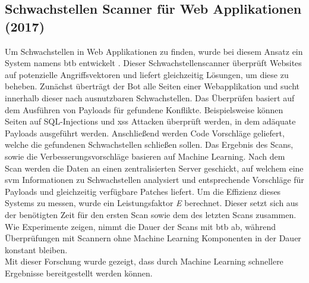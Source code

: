 \documentclass[
    12pt, %
    DIV10,
    ngerman, %
    a4paper, %
    oneside, %
    titlepage, %
    parskip=half, %
    headings=normal, %
    listof=totoc, %
    bibliography=totoc, %
    index=totoc, %
    captions=tableheading, %
    final %
]{scrreprt}
\begin{document}
\subsection{Schwachstellen Scanner für Web Applikationen (2017)}
Um Schwachstellen in Web Applikationen zu finden, wurde bei diesem Ansatz ein System namens \ac{btb} entwickelt \parencite{VidyavardhakaCollegeofEngineering2017}. Dieser Schwachstellenscanner überprüft Websites auf potenzielle Angriffsvektoren und liefert gleichzeitig Lösungen, um diese zu beheben. Zunächst überträgt der Bot alle Seiten einer Webapplikation und sucht innerhalb dieser nach ausnutzbaren Schwachstellen. Das Überprüfen basiert auf dem Ausführen von Payloads für gefundene Konflikte. Beispielsweise können Seiten auf SQL-Injections und \ac{xss} Attacken überprüft werden, in dem adäquate Payloads ausgeführt werden. Anschlie{\ss}end werden Code Vorschläge geliefert, welche die gefundenen Schwachstellen schlie{\ss}en sollen. Das Ergebnis des Scans, sowie die Verbesserungsvorschläge basieren auf Machine Learning. Nach dem Scan werden die Daten an einen zentralisierten Server geschickt, auf welchem eine \ac{svm} Informationen zu Schwachstellen analysiert und entsprechende Vorschläge für Payloads und gleichzeitig verfügbare Patches liefert. Um die Effizienz dieses Systems zu messen, wurde ein Leistungsfaktor \emph{E} berechnet. Dieser setzt sich aus der benötigten Zeit für den ersten Scan sowie dem des letzten Scans zusammen. Wie Experimente zeigen, nimmt die Dauer der Scans mit \ac{btb} ab, während Überprüfungen mit Scannern ohne Machine Learning Komponenten in der Dauer konstant bleiben.\\
Mit dieser Forschung wurde gezeigt, dass durch Machine Learning schnellere Ergebnisse bereitgestellt werden können.
%
\end{document}
